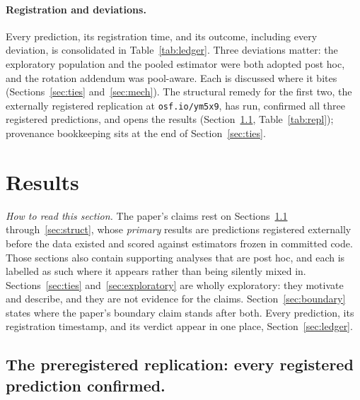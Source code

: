 \documentclass[11pt]{article}
\begin{document}
\paragraph{Registration and deviations.}
Every prediction, its registration time, and its outcome, including every deviation, is consolidated in Table~\ref{tab:ledger}.
Three deviations matter: the exploratory population and the pooled estimator were both adopted post hoc, and the rotation addendum was pool-aware.
Each is discussed where it bites (Sections~\ref{sec:ties} and~\ref{sec:mech}).
The structural remedy for the first two, the externally registered replication at \texttt{osf.io/ym5x9}, has run, confirmed all three registered predictions, and opens the results (Section~\ref{sec:repl}, Table~\ref{tab:repl}); provenance bookkeeping sits at the end of Section~\ref{sec:ties}.

\section{Results}

\emph{How to read this section.}
The paper's claims rest on Sections~\ref{sec:repl} through~\ref{sec:struct}, whose \emph{primary} results are predictions registered externally before the data existed and scored against estimators frozen in committed code.
Those sections also contain supporting analyses that are post hoc, and each is labelled as such where it appears rather than being silently mixed in.
Sections~\ref{sec:ties} and~\ref{sec:exploratory} are wholly exploratory: they motivate and describe, and they are not evidence for the claims.
Section~\ref{sec:boundary} states where the paper's boundary claim stands after both.
Every prediction, its registration timestamp, and its verdict appear in one place, Section~\ref{sec:ledger}.


\FloatBarrier
\subsection{The preregistered replication: every registered prediction confirmed.}
\label{sec:repl}
\end{document}
